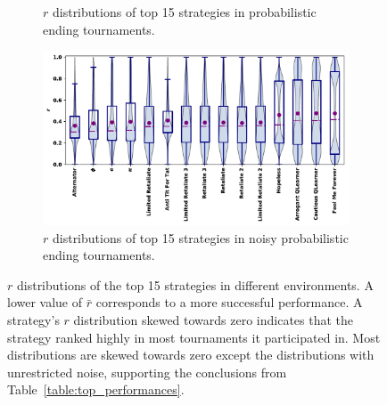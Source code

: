 \documentclass{article}
\begin{document}
\begin{figure}[!htbp]
\begin{subfigure}{0.485\textwidth}
        \caption{$r$ distributions of top 15 strategies in probabilistic ending tournaments.}\label{fig:probend_results}
    \end{subfigure}
    \quad
    \begin{subfigure}{0.485\textwidth}
        \centering
        \includegraphics[width=\textwidth]{../images/r_distribution_probend_noise.pdf}
        \caption{$r$ distributions of top 15 strategies in noisy probabilistic ending tournaments.}
        \label{fig:probend_noise_results}
    \end{subfigure}
    \caption{\(r\) distributions of the top 15 strategies in different
    environments. A lower value of \(\bar{r}\) corresponds to a more successful
    performance. A strategy's \(r\) distribution skewed towards zero indicates
    that the strategy ranked highly in most tournaments it participated in. Most
    distributions are skewed towards zero except the distributions with
    unrestricted noise, supporting the conclusions from
    Table~\ref{table:top_performances}.}\label{fig:r_distributions}
\end{figure}
\end{document}

